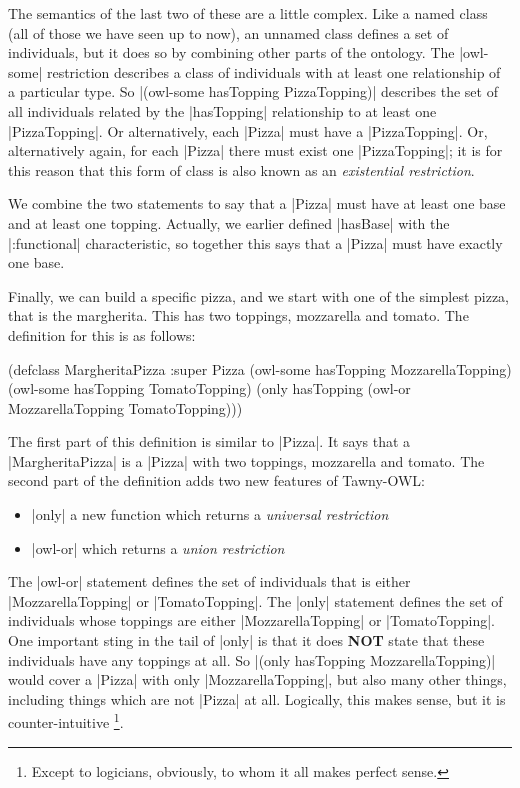 The semantics of the last two of these are a little complex. Like a named
class (all of those we have seen up to now), an unnamed class defines a set of
individuals, but it does so by combining other parts of the ontology. The
|owl-some| restriction describes a class of individuals with at least one
relationship of a particular type. So
|(owl-some hasTopping PizzaTopping)| describes the set of all individuals
related by the |hasTopping| relationship to at least one
|PizzaTopping|. Or alternatively, each |Pizza| must have a
|PizzaTopping|. Or, alternatively again, for each |Pizza| there must
exist one |PizzaTopping|; it is for this reason that this form of class
is also known as an \emph{existential restriction}.

We combine the two statements to say that a |Pizza| must have at least one
base and at least one topping. Actually, we earlier defined |hasBase| with the
|:functional| characteristic, so together this says that a |Pizza| must have
exactly one base.

Finally, we can build a specific pizza, and we start with one of the simplest
pizza, that is the margherita. This has two toppings, mozzarella and tomato.
The definition for this is as follows:

\begin{tawny}
(defclass MargheritaPizza
  :super
  Pizza
  (owl-some hasTopping MozzarellaTopping)
  (owl-some hasTopping TomatoTopping)
  (only hasTopping (owl-or MozzarellaTopping TomatoTopping)))
\end{tawny}

The first part of this definition is similar to |Pizza|. It says that a
|MargheritaPizza| is a |Pizza| with two toppings, mozzarella and tomato. The
second part of the definition adds two new features of Tawny-OWL:

\begin{itemize}
\item |only| a new function which returns a \emph{universal restriction}
\item |owl-or| which returns a \emph{union restriction}
\end{itemize}

The |owl-or| statement defines the set of individuals that is either
|MozzarellaTopping| or |TomatoTopping|. The |only| statement
defines the set of individuals whose toppings are either
|MozzarellaTopping| or |TomatoTopping|. One important sting in the
tail of |only| is that it does \textbf{NOT} state that these individuals
have any toppings at all. So |(only hasTopping MozzarellaTopping)| would
cover a |Pizza| with only |MozzarellaTopping|, but also many other
things, including things which are not |Pizza| at all. Logically, this
makes sense, but it is counter-intuitive \footnote{Except to logicians,
  obviously, to whom it all makes perfect sense.}.

